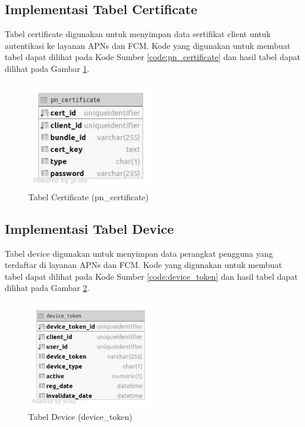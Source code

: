 \subsection{Implementasi Tabel Certificate}
\par Tabel certificate digunakan untuk menyimpan data sertifikat client untuk autentikasi ke layanan APNs dan FCM. Kode yang digunakan untuk membuat tabel dapat dilihat pada Kode Sumber \ref{code:pn_certificate} dan hasil tabel dapat dilihat pada Gambar \ref{tabel_pn_certificate}.

\begin{figure}[H]
    \centering\includegraphics[width=0.5\textwidth]{bab4/figures/tabel_pn_certificate.jpg}
    \caption{Tabel Certificate (pn\_certificate)}
    \label{tabel_pn_certificate}
\end{figure}

\subsection{Implementasi Tabel Device}
\par Tabel device digunakan untuk menyimpan data perangkat pengguna yang terdaftar di layanan APNs dan FCM. Kode yang digunakan untuk membuat tabel dapat dilihat pada Kode Sumber \ref{code:device_token} dan hasil tabel dapat dilihat pada Gambar \ref{tabel_device_token}.

\begin{figure}[H]
    \centering\includegraphics[width=0.5\textwidth]{bab4/figures/tabel_device_token.jpg}
    \caption{Tabel Device (device\_token)}
    \label{tabel_device_token}
\end{figure}

